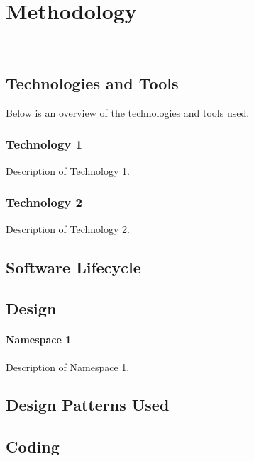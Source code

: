 \chapter{Methodology}
\label{chap:Methodology}

\\

\section{Technologies and Tools}
\label{sec:technologies-tools}

Below is an overview of the technologies and tools used.

\subsection*{Technology 1}
Description of Technology 1.

\subsection*{Technology 2}
Description of Technology 2.

\section{Software Lifecycle}
\label{sec:software-lifecycle}

\section{Design}
\label{sec:design}

\subsubsection{Namespace 1} %
Description of Namespace 1.

\begin{namespacedesc}
\end{namespacedesc}

\section{Design Patterns Used}

\section{Coding}

